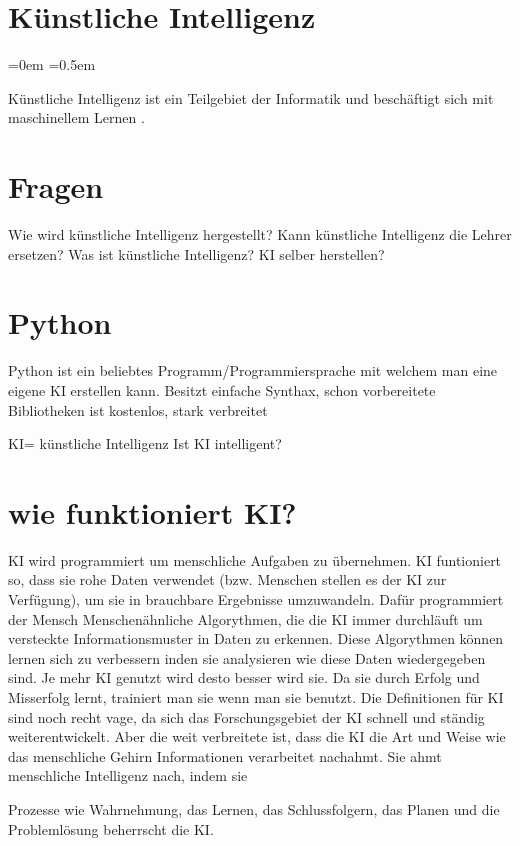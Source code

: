 \section{Künstliche Intelligenz}
\label{sec:ai}
\parindent=0em
\parskip=0.5em

Künstliche Intelligenz ist ein Teilgebiet der Informatik und beschäftigt sich mit maschinellem Lernen \citep{ai-wikipedia}.



\section {Fragen}
Wie wird künstliche Intelligenz hergestellt?
Kann künstliche Intelligenz die Lehrer ersetzen?
Was ist künstliche Intelligenz?
KI selber herstellen?

\section {Python}
Python ist ein beliebtes Programm/Programmiersprache mit welchem man eine eigene KI erstellen kann.
Besitzt einfache Synthax, schon vorbereitete Bibliotheken
ist kostenlos, stark verbreitet

KI= künstliche Intelligenz 
Ist KI intelligent?

\section {wie funktioniert KI?}
KI wird programmiert um menschliche Aufgaben zu übernehmen.
KI funtioniert so, dass sie rohe Daten verwendet (bzw. Menschen stellen es der KI zur Verfügung), um sie in brauchbare Ergebnisse umzuwandeln.
Dafür programmiert der Mensch Menschenähnliche Algorythmen, die die KI immer durchläuft um versteckte Informationsmuster in Daten zu erkennen.
Diese Algorythmen können lernen sich zu verbessern inden sie analysieren wie diese Daten wiedergegeben sind.
Je mehr KI genutzt wird desto besser wird sie. Da sie durch Erfolg und Misserfolg lernt, trainiert man sie wenn man sie benutzt.
Die Definitionen für KI sind noch recht vage, da sich das Forschungsgebiet der KI schnell und ständig weiterentwickelt. Aber die weit verbreitete ist,
dass die KI die Art und Weise wie das menschliche Gehirn Informationen verarbeitet nachahmt.
Sie ahmt menschliche Intelligenz nach, indem sie 

Prozesse wie Wahrnehmung, das Lernen, das Schlussfolgern, das Planen und die Problemlösung beherrscht die KI.

